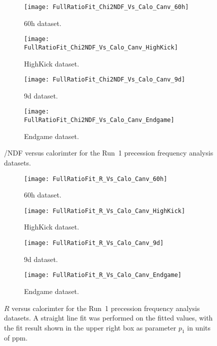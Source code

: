 \begin{figure}[]
\centering
    \begin{subfigure}[]{0.45\textwidth}
        \centering
        \texttt{[image: FullRatioFit\_Chi2NDF\_Vs\_Calo\_Canv\_60h]}
        \caption{60h dataset.}
    \end{subfigure}%
    \begin{subfigure}[]{0.45\textwidth}
        \centering
        \texttt{[image: FullRatioFit\_Chi2NDF\_Vs\_Calo\_Canv\_HighKick]}
        \caption{HighKick dataset.}
    \end{subfigure}

    \begin{subfigure}[]{0.45\textwidth}
        \centering
        \texttt{[image: FullRatioFit\_Chi2NDF\_Vs\_Calo\_Canv\_9d]}
        \caption{9d dataset.}
    \end{subfigure}%
    \begin{subfigure}[]{0.45\textwidth}
        \centering
        \texttt{[image: FullRatioFit\_Chi2NDF\_Vs\_Calo\_Canv\_Endgame]}
        \caption{Endgame dataset.}
    \end{subfigure}
\caption[\chisq/NDF versus calorimeter number]{\chisq/NDF versus calorimter for the Run~1 precession frequency analysis datasets.}
\label{fig:caloFits_chi2}
\end{figure}


\begin{figure}[]
\centering
    \begin{subfigure}[]{0.45\textwidth}
        \centering
        \texttt{[image: FullRatioFit\_R\_Vs\_Calo\_Canv\_60h]}
        \caption{60h dataset.}
    \end{subfigure}%
    \begin{subfigure}[]{0.45\textwidth}
        \centering
        \texttt{[image: FullRatioFit\_R\_Vs\_Calo\_Canv\_HighKick]}
        \caption{HighKick dataset.}
    \end{subfigure}

    \begin{subfigure}[]{0.45\textwidth}
        \centering
        \texttt{[image: FullRatioFit\_R\_Vs\_Calo\_Canv\_9d]}
        \caption{9d dataset.}
    \end{subfigure}%
    \begin{subfigure}[]{0.45\textwidth}
        \centering
        \texttt{[image: FullRatioFit\_R\_Vs\_Calo\_Canv\_Endgame]}
        \caption{Endgame dataset.}
    \end{subfigure}
\caption[$R$ versus calorimeter number]{$R$ versus calorimter for the Run~1 precession frequency analysis datasets. A straight line fit was performed on the fitted values, with the fit result shown in the upper right box as parameter $p_{1}$ in units of ppm.}
\label{fig:caloFits_R}
\end{figure}


